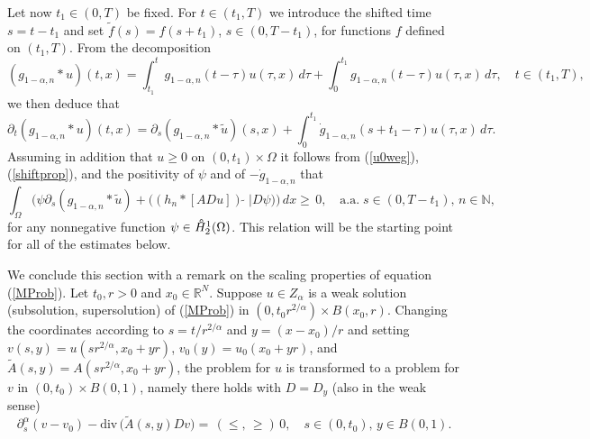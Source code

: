 \documentclass[10pt]{article}
\newcommand{\iR}{\mathbb{R}}
\newcommand{\iN}{\mathbb{N}}
\newcommand{\oH}{\hspace*{0.39em}\raisebox{0.6ex}{\textdegree}\hspace{-0.72em}H}
\begin{document}
Let now $t_1\in (0,T)$ be fixed. For $t\in (t_1,T)$ we introduce the
shifted time $s=t-t_1$ and set $\tilde{f}(s)=f(s+t_1)$, $s\in
(0,T-t_1)$, for functions $f$ defined on $(t_1,T)$. From the
decomposition
\[
(g_{1-\alpha,n}\ast u)(t,x)=\int_{t_1}^t
g_{1-\alpha,n}(t-\tau)u(\tau,x)\,d\tau+\int_{0}^{t_1}
g_{1-\alpha,n}(t-\tau)u(\tau,x)\,d\tau,\quad t\in (t_1,T),
\]
we then deduce that
\begin{equation} \label{shiftprop}
\partial_t(g_{1-\alpha,n}\ast u)(t,x)=\partial_s(g_{1-\alpha,n}\ast
\tilde{u})(s,x)+\int_0^{t_1}\dot{g}_{1-\alpha,n}(s+t_1-\tau)u(\tau,x)\,d\tau.
\end{equation}
Assuming in addition that $u\ge 0$ on $(0,t_1)\times \Omega$ it
follows from (\ref{u0weg}), (\ref{shiftprop}), and the positivity
of $\psi$ and of $-\dot{g}_{1-\alpha,n}$ that
\begin{equation} \label{shiftprob}
\int_\Omega \Big(\psi \partial_s(g_{1-\alpha,n}\ast
\tilde{u})+\big((h_n\ast [ADu])\,\tilde{}\;|D\psi\big)\Big)\,dx \ge
\,0,\quad\mbox{a.a.}\;s\in (0,T-t_1),\,n\in \iN,
\end{equation}
for any nonnegative function $\psi\in \oH^1_2(\Omega)$. This
relation will be the starting point for all of the estimates below.

We conclude this section with a remark on the scaling properties of
equation (\ref{MProb}). Let $t_0,r>0$ and $x_0\in \iR^N$. Suppose
$u\in Z_\alpha$ is a weak solution (subsolution, supersolution) of
(\ref{MProb}) in $(0,t_0 r^{2/\alpha})\times B(x_0,r)$. Changing the
coordinates according to $s=t/r^{2/\alpha}$ and $y=(x-x_0)/r$ and
setting $v(s,y)=u(sr^{2/\alpha},x_0+yr)$, $v_0(y)=u_0(x_0+yr)$, and
$\tilde{A}(s,y)=A(sr^{2/\alpha},x_0+yr)$, the problem for $u$ is
transformed to a problem for $v$ in $(0,t_0)\times B(0,1)$, namely
there holds with $D=D_y$ (also in the weak sense)
\begin{equation} \label{MProbScal}
\partial_s^\alpha (v-v_0)-\mbox{div}\,\big(\tilde{A}(s,y)Dv\big)=\,(\le,\,\ge)\,0,\quad
s\in (0,t_0),\,y\in B(0,1).
\end{equation}


\end{document}
